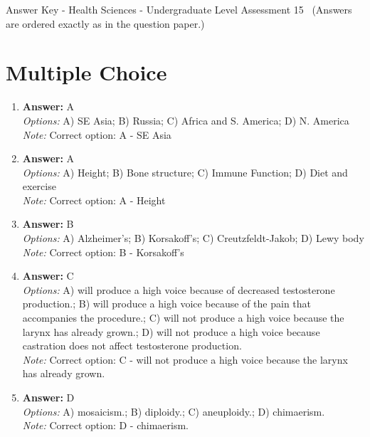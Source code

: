 \documentclass[12pt]{article}
\begin{document}
\begin{center}
Answer Key - Health Sciences - Undergraduate Level Assessment 15 \
\small (Answers are ordered exactly as in the question paper.)
\end{center}

\section*{Multiple Choice}
\begin{enumerate}[label=\arabic*.]
\item \textbf{Answer:} A
\\ \textit{Options:} A) SE Asia; B) Russia; C) Africa and S. America; D) N. America
\\ \textit{Note:} Correct option: A - SE Asia
\item \textbf{Answer:} A
\\ \textit{Options:} A) Height; B) Bone structure; C) Immune Function; D) Diet and exercise
\\ \textit{Note:} Correct option: A - Height
\item \textbf{Answer:} B
\\ \textit{Options:} A) Alzheimer's; B) Korsakoff's; C) Creutzfeldt-Jakob; D) Lewy body
\\ \textit{Note:} Correct option: B - Korsakoff's
\item \textbf{Answer:} C
\\ \textit{Options:} A) will produce a high voice because of decreased testosterone production.; B) will produce a high voice because of the pain that accompanies the procedure.; C) will not produce a high voice because the larynx has already grown.; D) will not produce a high voice because castration does not affect testosterone production.
\\ \textit{Note:} Correct option: C - will not produce a high voice because the larynx has already grown.
\item \textbf{Answer:} D
\\ \textit{Options:} A) mosaicism.; B) diploidy.; C) aneuploidy.; D) chimaerism.
\\ \textit{Note:} Correct option: D - chimaerism.
\end{enumerate}
\end{document}
